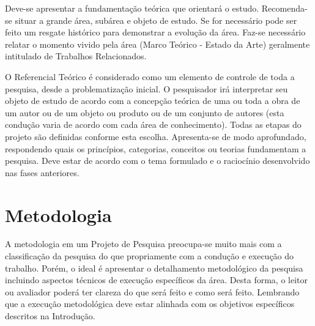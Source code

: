 \documentclass[
12pt,				%
openright,			%
oneside,
a4paper,			%
english,			%
french,				%
spanish,			%
brazil,				%
]{abntex2}
\begin{document}
	Deve-se apresentar a fundamentação teórica que orientará o estudo. Recomenda-se situar a grande área, subárea e objeto de estudo. Se for necessário pode ser feito um resgate histórico para demonstrar a evolução da área. Faz-se necessário relatar o momento vivido pela área (Marco Teórico - Estado da Arte) geralmente intitulado de Trabalhos Relacionados.
	
	O Referencial Teórico é considerado como um elemento de controle de toda a pesquisa, desde a problematização inicial. O pesquisador irá interpretar seu objeto de estudo de acordo com a concepção teórica de uma ou toda a obra de um autor ou de um objeto ou produto ou de um conjunto de autores (esta condução varia de acordo com cada área de conhecimento). Todas as etapas do projeto são definidas conforme esta escolha. Apresenta-se de modo aprofundado, respondendo quais os princípios, categorias, conceitos ou teorias fundamentam a pesquisa. Deve estar de acordo com o tema formulado e o raciocínio desenvolvido nas fases anteriores. 
	
	
	
	\chapter{Metodologia}
	
	 A metodologia em um Projeto de Pesquisa preocupa-se muito mais com a classificação da pesquisa do que propriamente com a condução e execução do trabalho. Porém, o ideal é apresentar o detalhamento metodológico da pesquisa incluindo aspectos técnicos de execução específicos da área. Desta forma, o leitor ou avaliador poderá ter clareza do que será feito e como será feito. Lembrando que a execução metodológica deve estar alinhada com os objetivos específicos descritos na Introdução. 
	
\end{document}
